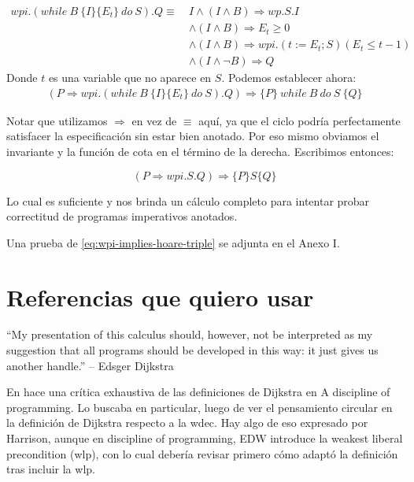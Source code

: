 \documentclass[12pt, a4paper, openany, fleqn]{book}
\begin{document}
    \begin{align*}
        wpi.(while\ B\ \{I\}\{E_t\}\ do\ S).Q \equiv\ & I \land (I \land B) \Rightarrow wp.S.I \\
            & \land (I \land B) \Rightarrow E_t \geqslant 0 \\
            & \land (I \land B) \Rightarrow wpi.(t := E_t; S)(E_t \leqslant t-1) \\
            & \land (I \land \lnot B) \Rightarrow Q
    \end{align*}
    Donde $t$ es una variable que no aparece en $S$.
    Podemos establecer ahora:
    \begin{align*}
        (P \Rightarrow wpi.(while\ B\ \{I\}\{E_t\}\ do\ S).Q) \Rightarrow \{P\}\ while\ B\ do\ S\ \{Q\}
    \end{align*}

    Notar que utilizamos $\Rightarrow$ en vez de $\equiv$ aquí, ya que el ciclo podría perfectamente satisfacer la especificación sin estar bien anotado. Por eso mismo obviamos el invariante y la función de cota en el término de la derecha. Escribimos entonces:

    \begin{equation}
        \label{eq:wpi-implies-hoare-triple}
        (P \Rightarrow wpi.S.Q) \Rightarrow \{P\}S\{Q\}
    \end{equation}

    Lo cual es suficiente y nos brinda un cálculo completo para intentar probar correctitud de programas imperativos anotados.

    Una prueba de \eqref{eq:wpi-implies-hoare-triple} se adjunta en el Anexo I.

    \section{Referencias que quiero usar}


    ``My presentation of this calculus should, however, not be interpreted as my suggestion that all programs should be developed in this way: it just gives us another handle.'' -- Edsger Dijkstra \cite{EWD:EWD418}

    En \cite{10.1007/BFb0055136} hace una crítica exhaustiva de las definiciones de Dijkstra en A discipline of programming. Lo buscaba en particular, luego de ver el pensamiento circular en la definición de Dijkstra respecto a la wdec. Hay algo de eso expresado por Harrison, aunque en discipline of programming, EDW introduce la weakest liberal precondition (wlp), con lo cual debería revisar primero cómo adaptó la definición tras incluir la wlp.
\end{document}
